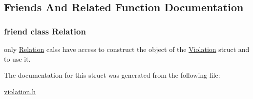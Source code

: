 \subsection{Friends And Related Function Documentation}
\subsubsection[{\texorpdfstring{Relation}{Relation}}]{\setlength{\rightskip}{0pt plus 5cm}friend class {\bf Relation}\hspace{0.3cm}{\ttfamily [friend]}}\hypertarget{struct_violation_a7ee004262f27f8c916688911a71e3aa1}{}\label{struct_violation_a7ee004262f27f8c916688911a71e3aa1}
only \hyperlink{class_relation}{Relation} calss have access to construct the object of the \hyperlink{struct_violation}{Violation} struct and to use it. 

The documentation for this struct was generated from the following file\+:\begin{DoxyCompactItemize}
\item 
\hyperlink{violation_8h}{violation.\+h}\end{DoxyCompactItemize}
